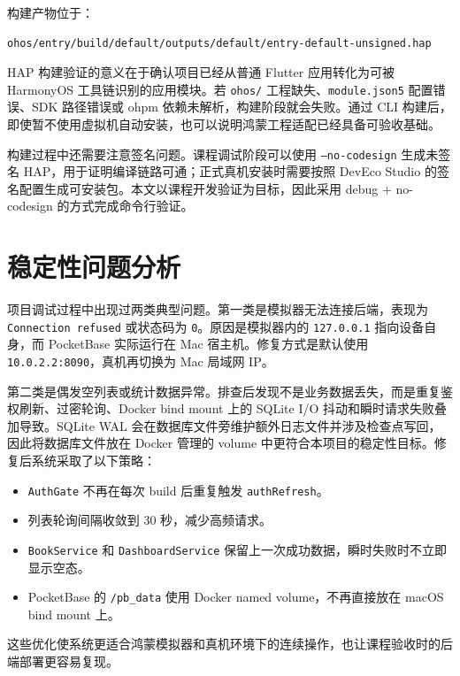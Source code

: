 构建产物位于：

\begin{lstlisting}[style=codexcode]
ohos/entry/build/default/outputs/default/entry-default-unsigned.hap
\end{lstlisting}

HAP 构建验证的意义在于确认项目已经从普通 Flutter 应用转化为可被 HarmonyOS 工具链识别的应用模块。若 \texttt{ohos/} 工程缺失、\texttt{module.json5} 配置错误、SDK 路径错误或 ohpm 依赖未解析，构建阶段就会失败。通过 CLI 构建后，即使暂不使用虚拟机自动安装，也可以说明鸿蒙工程适配已经具备可验收基础。

构建过程中还需要注意签名问题。课程调试阶段可以使用 \texttt{--no-codesign} 生成未签名 HAP，用于证明编译链路可通；正式真机安装时需要按照 DevEco Studio 的签名配置生成可安装包。本文以课程开发验证为目标，因此采用 debug + no-codesign 的方式完成命令行验证。

\section{稳定性问题分析}

项目调试过程中出现过两类典型问题。第一类是模拟器无法连接后端，表现为 \texttt{Connection refused} 或状态码为 \texttt{0}。原因是模拟器内的 \texttt{127.0.0.1} 指向设备自身，而 PocketBase 实际运行在 Mac 宿主机。修复方式是默认使用 \texttt{10.0.2.2:8090}，真机再切换为 Mac 局域网 IP。

第二类是偶发空列表或统计数据异常。排查后发现不是业务数据丢失，而是重复鉴权刷新、过密轮询、Docker bind mount 上的 SQLite I/O 抖动和瞬时请求失败叠加导致。SQLite WAL 会在数据库文件旁维护额外日志文件并涉及检查点写回，因此将数据库文件放在 Docker 管理的 volume 中更符合本项目的稳定性目标\cite{sqlite_wal,docker_compose_volumes}。修复后系统采取了以下策略：

\begin{itemize}
    \item \texttt{AuthGate} 不再在每次 build 后重复触发 \texttt{authRefresh}。
    \item 列表轮询间隔收敛到 30 秒，减少高频请求。
    \item \texttt{BookService} 和 \texttt{DashboardService} 保留上一次成功数据，瞬时失败时不立即显示空态。
    \item PocketBase 的 \texttt{/pb\_data} 使用 Docker named volume，不再直接放在 macOS bind mount 上。
\end{itemize}

这些优化使系统更适合鸿蒙模拟器和真机环境下的连续操作，也让课程验收时的后端部署更容易复现。

